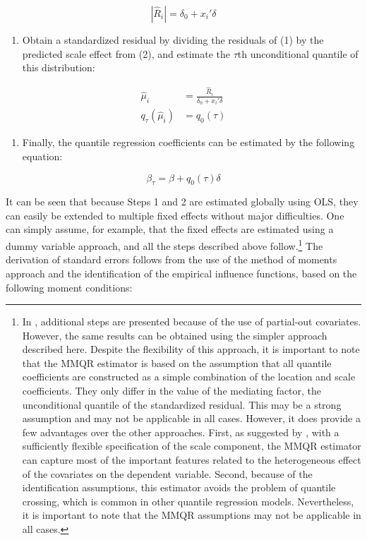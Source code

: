 \documentclass[bib]{statapress}
\providecommand{\tightlist}{%
  \setlength{\itemsep}{0pt}\setlength{\parskip}{0pt}}\usepackage{longtable,booktabs,array}
\begin{document}
\[|\hat R_i| = \delta_0 + x_{i}' \delta\]

\begin{enumerate}
\def\labelenumi{\arabic{enumi}.}
\setcounter{enumi}{2}
\tightlist
\item
  Obtain a standardized residual by dividing the residuals of (1) by the
  predicted scale effect from (2), and estimate the \(\tau\)th
  unconditional quantile of this distribution:
\end{enumerate}

\[\begin{aligned}
\hat \mu_i &= \frac{\hat R_i}{\delta_0 + x_{i}' \delta} \\
q_{\tau}(\hat \mu_i) &= q_0(\tau)
\end{aligned}
\]

\begin{enumerate}
\def\labelenumi{\arabic{enumi}.}
\setcounter{enumi}{3}
\tightlist
\item
  Finally, the quantile regression coefficients can be estimated by the
  following equation:
\end{enumerate}

\[\beta_{\tau} = \beta + q_0(\tau) \delta
\]

It can be seen that because Steps 1 and 2 are estimated globally using
OLS, they can easily be extended to multiple fixed effects without major
difficulties. One can simply assume, for example, that the fixed effects
are estimated using a dummy variable approach, and all the steps
described above follow.\footnote{In \citet{riosavila2024}, additional
  steps are presented because of the use of partial-out covariates.
  However, the same results can be obtained using the simpler approach
  described here. Despite the flexibility of this approach, it is
  important to note that the MMQR estimator is based on the assumption
  that all quantile coefficients are constructed as a simple combination
  of the location and scale coefficients. They only differ in the value
  of the mediating factor, the unconditional quantile of the
  standardized residual. This may be a strong assumption and may not be
  applicable in all cases. However, it does provide a few advantages
  over the other approaches. First, as suggested by \citet{mss2019},
  with a sufficiently flexible specification of the scale component, the
  MMQR estimator can capture most of the important features related to
  the heterogeneous effect of the covariates on the dependent variable.
  Second, because of the identification assumptions, this estimator
  avoids the problem of quantile crossing\footnotemark{}, which is
  common in other quantile regression models. Nevertheless, it is
  important to note that the MMQR assumptions may not be applicable in
  all cases.} The derivation of standard errors follows from the use of
the method of moments approach and the identification of the empirical
influence functions, based on the following moment conditions:
\end{document}
